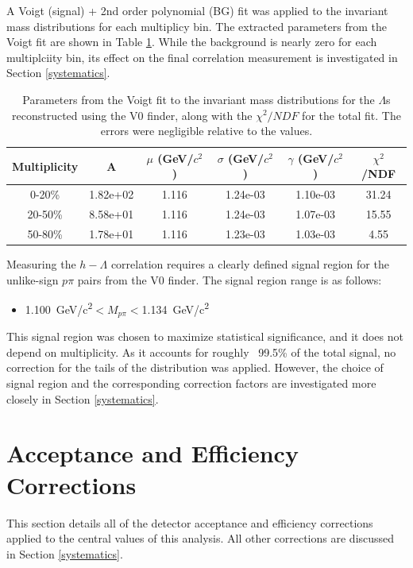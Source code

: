 \documentclass[ALICE,manyauthors]{ALICE_analysis_notes}
\begin{document}
 A Voigt (signal) + 2nd order polynomial (BG) fit was applied to the invariant mass distributions for each multiplicy bin. The extracted parameters from the Voigt fit are shown in Table \ref{voigt_parameters}. While the background is nearly zero for each multiplciity bin, its effect on the final correlation measurement is investigated in Section \ref{systematics}.

\begin{table}[h!]
    \centering
\begin{tabular}{| c | c | c | c | c | c | }
\hline
Multiplicity & A & $\mu$ (GeV/$c^2$) & $\sigma$ (GeV/$c^2$) & $\gamma$ (GeV/$c^2$) & $\chi^2$/NDF \\
\hline
0-20\% & 1.82e+02  & 1.116 & 1.24e-03 & 1.10e-03 & 31.24\\
20-50\% & 8.58e+01 & 1.116 & 1.24e-03 & 1.07e-03 & 15.55\\
50-80\% & 1.78e+01 & 1.116 & 1.23e-03 & 1.03e-03 & 4.55\\
\hline
\end{tabular}
\caption{Parameters from the Voigt fit to the invariant mass distributions for the $\Lambda$s reconstructed using the V0 finder, along with the $\chi^2/NDF$ for the total fit. The errors were negligible relative to the values.}
\label{voigt_parameters}
\end{table}

 Measuring the $h-\Lambda$ correlation requires a clearly defined signal region for the unlike-sign $p\pi$ pairs from the V0 finder. The signal region range is as follows:

\begin{itemize}
	\item {}  \SI{1.100}{GeV/c^2}$< M_{p\pi} < $\SI{1.134}{GeV/c^2}
\end{itemize}

This signal region was chosen to maximize statistical significance, and it does not depend on multiplicity. As it accounts for roughly ~99.5\% of the total signal, no correction for the tails of the distribution was applied. However, the choice of signal region and the corresponding correction factors are investigated more closely in Section \ref{systematics}.

\section{Acceptance and Efficiency Corrections}
\label{efficiency_acceptance}
This section details all of the detector acceptance and efficiency corrections applied to the central values of this analysis. All other corrections are discussed in Section \ref{systematics}.
\end{document}
